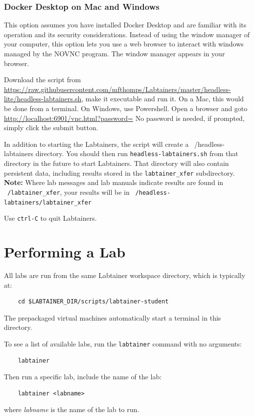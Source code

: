 \documentclass[12pt]{article}
\begin{document}
\subsubsection{Docker Desktop on Mac and Windows}
This option assumes you have installed Docker Desktop and are familiar with its operation
and its security considerations.  Instead of using the window manager of your computer, this option lets you use a web browser
to interact with windows managed by the NOVNC program.  The window manager appears in your browser.

Download the script from \url{https://raw.githubusercontent.com/mfthomps/Labtainers/master/headless-lite/headless-labtainers.sh},
make it executable and run it.  On a Mac, this would be done from a terminal.  On Windows, use Powershell.
Open a browser and goto \url{http://localhost:6901/vnc.html?password=}
No password is needed, if prompted, simply click the submit button.

In addition to starting the Labtainers, the script will create a ~/headless-labtainers directory.  You should then run
{\tt headless-labtainers.sh} from that directory in the future to start Labtainers.  That directory will also contain persistent data, including
results stored in the {\tt labtainer\_xfer} subdirectory.  \textbf{Note:} Where lab messages and lab manuals indicate 
results are found in {\tt ~/labtainer\_xfer}, your results will be in {\tt ~/headless-labtainers/labtainer\_xfer}

Use {\tt ctrl-C} to quit Labtainers. 

\section{Performing a Lab}
\label{performing}
All labs are run from the same Labtainer workspace directory, which is typically at:
\begin{verbatim}
    cd $LABTAINER_DIR/scripts/labtainer-student
\end{verbatim}
\noindent The prepackaged virtual machines automatically start a terminal in this directory.

To see a list of available labs, run the {\tt labtainer} command with no arguments:
\begin{verbatim}
    labtainer 
\end{verbatim}
Then run a specific lab, include the name of the lab:
\begin{verbatim}
    labtainer <labname>
\end{verbatim}
\noindent where \textit{labname} is the name of the lab to run.  
\end{document}
